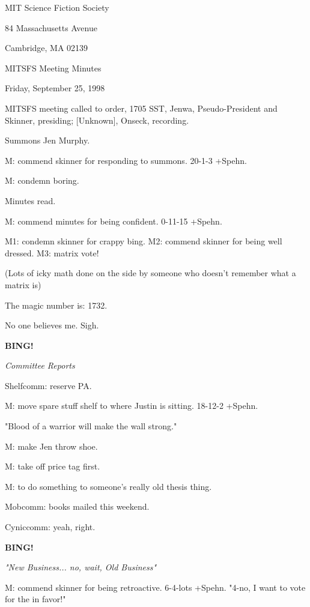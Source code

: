 \documentclass[12pt]{article}
\newcommand{\bing}{{\bf BING!} }
\newcommand{\goto}[1]{\bing \vskip 12pt \centerline{{\em{#1}}}}
\begin{document}
\begin{center}

MIT Science Fiction Society 

84 Massachusetts Avenue

Cambridge, MA 02139

\vspace{12pt}

MITSFS Meeting Minutes 

Friday, September 25, 1998

\end{center}
 
\vspace{18pt}

\setlength{\parskip}{6pt}

\noindent
MITSFS meeting called to order, 1705 SST,
Jenwa, Pseudo-President and Skinner, presiding; [Unknown], Onseck, recording.

Summons Jen Murphy.

M: commend skinner for responding to summons. 20-1-3 +Spehn.

M: condemn boring.

Minutes read.

M: commend minutes for being confident. 0-11-15 +Spehn.

M1: condemn skinner for crappy bing. M2: commend skinner for being well dressed. M3: matrix vote!

(Lots of icky math done on the side by someone who doesn't remember what a matrix is)

The magic number is: 1732.

No one believes me. Sigh.

\goto{Committee Reports}

Shelfcomm: reserve PA.

M: move spare stuff shelf to where Justin is sitting. 18-12-2 +Spehn.

"Blood of a warrior will make the wall strong."

M: make Jen throw shoe.

M: take off price tag first.

M: to do something to someone's really old thesis thing.

Mobcomm: books mailed this weekend.

Cyniccomm: yeah, right.

\goto{"New Business... no, wait, Old Business"}

M: commend skinner for being retroactive. 6-4-lots +Spehn. "4-no, I want to vote for the in favor!"
\end{document}
